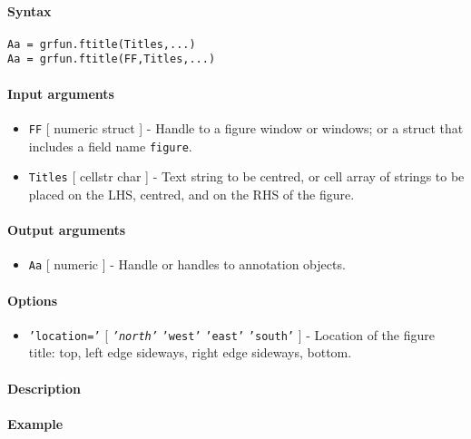 


	\paragraph{Syntax}\label{syntax}

\begin{verbatim}
Aa = grfun.ftitle(Titles,...)
Aa = grfun.ftitle(FF,Titles,...)
\end{verbatim}

\paragraph{Input arguments}\label{input-arguments}

\begin{itemize}
\item
  \texttt{FF} {[} numeric \textbar{} struct {]} - Handle to a figure
  window or windows; or a struct that includes a field name
  \texttt{figure}.
\item
  \texttt{Titles} {[} cellstr \textbar{} char {]} - Text string to be
  centred, or cell array of strings to be placed on the LHS, centred,
  and on the RHS of the figure.
\end{itemize}

\paragraph{Output arguments}\label{output-arguments}

\begin{itemize}
\itemsep1pt\parskip0pt
\item
  \texttt{Aa} {[} numeric {]} - Handle or handles to annotation objects.
\end{itemize}

\paragraph{Options}\label{options}

\begin{itemize}
\itemsep1pt\parskip0pt
\item
  \texttt{'location='} {[} \emph{\texttt{'north'}} \textbar{}
  \texttt{'west'} \textbar{} \texttt{'east'} \textbar{} \texttt{'south'}
  {]} - Location of the figure title: top, left edge sideways, right
  edge sideways, bottom.
\end{itemize}

\paragraph{Description}\label{description}

\paragraph{Example}\label{example}


